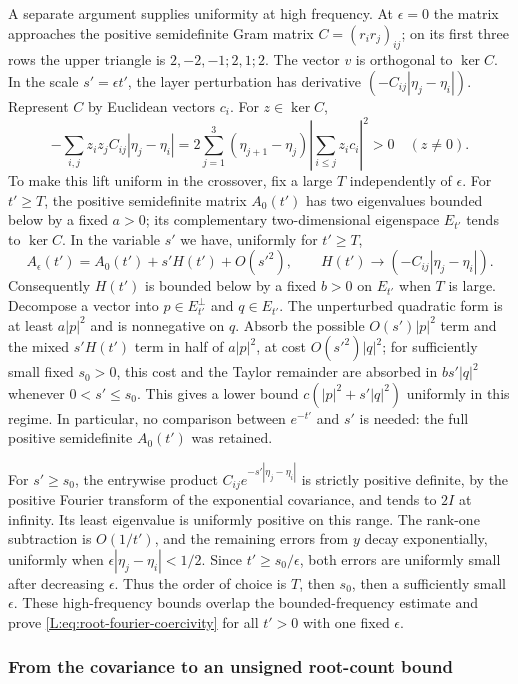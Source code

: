 A separate argument supplies uniformity at high frequency. At
$\epsilon=0$ the matrix approaches the positive semidefinite Gram
matrix $C=(r_ir_j)_{ij}$; on its first three rows the upper triangle is
$2,-2,-1;2,1;2$. The vector $v$ is orthogonal to $\ker C$. In the scale
$s'=\epsilon t'$, the layer perturbation has derivative
$(-C_{ij}|\eta_j-\eta_i|)$. Represent $C$ by Euclidean vectors $c_i$.
For $z\in\ker C$,
\[
 -\sum_{i,j}z_iz_jC_{ij}|\eta_j-\eta_i|
 =2\sum_{j=1}^3(\eta_{j+1}-\eta_j)
       \left|\sum_{i\le j}z_ic_i\right|^2>0
 \quad(z\ne0).
\]
To make this lift uniform in the crossover, fix a large $T$ independently
of $\epsilon$. For $t'\ge T$, the positive semidefinite matrix
$A_0(t')$ has two eigenvalues bounded below by a fixed $a>0$; its
complementary two-dimensional eigenspace $E_{t'}$ tends to $\ker C$.
In the variable $s'$ we have, uniformly for $t'\ge T$,
\[
 A_\epsilon(t')=A_0(t')+s'H(t')+O(s'^2),
 \qquad H(t')\longrightarrow(-C_{ij}|\eta_j-\eta_i|).
\]
Consequently $H(t')$ is bounded below by a fixed $b>0$ on $E_{t'}$
when $T$ is large. Decompose a vector into $p\in E_{t'}^\perp$ and
$q\in E_{t'}$. The unperturbed quadratic form is at least
$a|p|^2$ and is nonnegative on $q$. Absorb the possible
$O(s')|p|^2$ term and the mixed $s'H(t')$ term in half of
$a|p|^2$, at cost $O(s'^2)|q|^2$; for sufficiently small
fixed $s_0>0$, this cost and the Taylor remainder are absorbed in
$b s'|q|^2$ whenever $0<s'\le s_0$. This gives a lower bound
$c(|p|^2+s'|q|^2)$ uniformly in this regime. In particular, no comparison
between $e^{-t'}$ and $s'$ is needed: the full positive semidefinite
$A_0(t')$ was retained.

For $s'\ge s_0$, the entrywise product
$C_{ij}e^{-s'|\eta_j-\eta_i|}$ is strictly positive definite, by the
positive Fourier transform of the exponential covariance, and tends to
$2I$ at infinity. Its least eigenvalue is uniformly positive on this
range. The rank-one subtraction is $O(1/t')$, and the remaining errors
from $y$ decay exponentially, uniformly when
$\epsilon|\eta_j-\eta_i|<1/2$. Since $t'\ge s_0/\epsilon$, both
errors are uniformly small after decreasing $\epsilon$. Thus the order
of choice is $T$, then $s_0$, then a sufficiently small $\epsilon$.
These high-frequency
bounds overlap the bounded-frequency estimate and prove
\eqref{L:eq:root-fourier-coercivity} for all $t'>0$ with one fixed
$\epsilon$.

\subsubsection*{From the covariance to an unsigned root-count bound}

